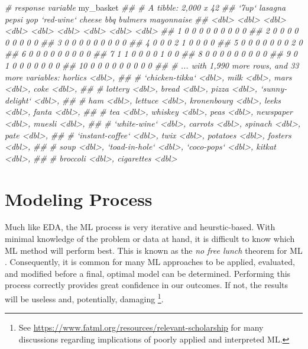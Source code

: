 \documentclass[]{krantz}
\makeatletter
\newenvironment{Shaded}{\begin{snugshade}}{\end{snugshade}}
\newcommand{\CommentTok}[1]{\textcolor[rgb]{0.37,0.37,0.37}{\textit{#1}}}
\newcommand{\NormalTok}[1]{#1}
\newenvironment{kframe}{%
\medskip{}
\setlength{\fboxsep}{.8em}
 \def\at@end@of@kframe{}%
 \ifinner\ifhmode%
  \def\at@end@of@kframe{\end{minipage}}%
  \begin{minipage}{\columnwidth}%
 \fi\fi%
 \def\FrameCommand##1{\hskip\@totalleftmargin \hskip-\fboxsep
 \colorbox{shadecolor}{##1}\hskip-\fboxsep
     \hskip-\linewidth \hskip-\@totalleftmargin \hskip\columnwidth}%
 \MakeFramed {\advance\hsize-\width
   \@totalleftmargin\z@ \linewidth\hsize
   \@setminipage}}%
 {\par\unskip\endMakeFramed%
 \at@end@of@kframe}
\renewenvironment{Shaded}{\begin{kframe}}{\end{kframe}}
\makeatother
\begin{document}
\begin{itemize}
\begin{Shaded}
\begin{Highlighting}[]
\CommentTok{# response variable}
\NormalTok{my_basket}
\CommentTok{## # A tibble: 2,000 x 42}
\CommentTok{##    `7up` lasagna pepsi   yop `red-wine` cheese   bbq bulmers mayonnaise}
\CommentTok{##    <dbl>   <dbl> <dbl> <dbl>      <dbl>  <dbl> <dbl>   <dbl>      <dbl>}
\CommentTok{##  1     0       0     0     0          0      0     0       0          0}
\CommentTok{##  2     0       0     0     0          0      0     0       0          0}
\CommentTok{##  3     0       0     0     0          0      0     0       0          0}
\CommentTok{##  4     0       0     0     2          1      0     0       0          0}
\CommentTok{##  5     0       0     0     0          0      0     0       2          0}
\CommentTok{##  6     0       0     0     0          0      0     0       0          0}
\CommentTok{##  7     1       1     0     0          0      0     1       0          0}
\CommentTok{##  8     0       0     0     0          0      0     0       0          0}
\CommentTok{##  9     0       1     0     0          0      0     0       0          0}
\CommentTok{## 10     0       0     0     0          0      0     0       0          0}
\CommentTok{## # ... with 1,990 more rows, and 33 more variables: horlics <dbl>,}
\CommentTok{## #   `chicken-tikka` <dbl>, milk <dbl>, mars <dbl>, coke <dbl>,}
\CommentTok{## #   lottery <dbl>, bread <dbl>, pizza <dbl>, `sunny-delight` <dbl>,}
\CommentTok{## #   ham <dbl>, lettuce <dbl>, kronenbourg <dbl>, leeks <dbl>, fanta <dbl>,}
\CommentTok{## #   tea <dbl>, whiskey <dbl>, peas <dbl>, newspaper <dbl>, muesli <dbl>,}
\CommentTok{## #   `white-wine` <dbl>, carrots <dbl>, spinach <dbl>, pate <dbl>,}
\CommentTok{## #   `instant-coffee` <dbl>, twix <dbl>, potatoes <dbl>, fosters <dbl>,}
\CommentTok{## #   soup <dbl>, `toad-in-hole` <dbl>, `coco-pops` <dbl>, kitkat <dbl>,}
\CommentTok{## #   broccoli <dbl>, cigarettes <dbl>}
\end{Highlighting}
\end{Shaded}
\end{itemize}

\hypertarget{process}{%
\chapter{Modeling Process}\label{process}}

Much like EDA, the ML process is very iterative and heurstic-based. With minimal knowledge of the problem or data at hand, it is difficult to know which ML method will perform best. This is known as the \emph{no free lunch} theorem for ML \citep{wolpert1996lack}. Consequently, it is common for many ML approaches to be applied, evaluated, and modified before a final, optimal model can be determined. Performing this process correctly provides great confidence in our outcomes. If not, the results will be useless and, potentially, damaging \footnote{See \url{https://www.fatml.org/resources/relevant-scholarship} for many discussions regarding implications of poorly applied and interpreted ML.}.
\end{document}

